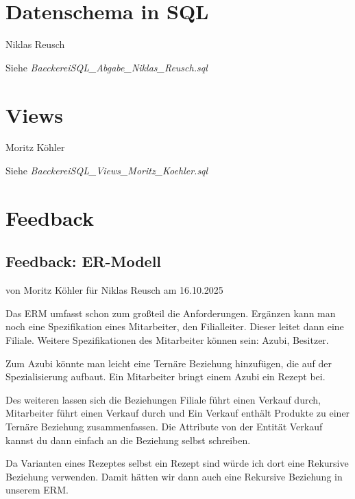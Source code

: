 \documentclass[a4paper]{article}
\begin{document}
\newpage
\section{Datenschema in SQL}

\begin{flushright}
Niklas Reusch
\end{flushright}

Siehe \textit{BaeckereiSQL\_Abgabe\_Niklas\_Reusch.sql}

\section{Views}

\begin{flushright}
Moritz Köhler
\end{flushright}

Siehe \textit{BaeckereiSQL\_Views\_Moritz\_Koehler.sql}

\newpage
\section{Feedback}

\subsection{Feedback: ER-Modell}

\begin{flushright}
von Moritz Köhler für Niklas Reusch am 16.10.2025
\end{flushright}

Das ERM umfasst schon zum großteil die Anforderungen. Ergänzen kann man noch eine Spezifikation eines Mitarbeiter, den Filialleiter. Dieser leitet dann eine Filiale. Weitere Spezifikationen des Mitarbeiter können sein: Azubi, Besitzer.

Zum Azubi könnte man leicht eine Ternäre Beziehung hinzufügen, die auf der Spezialisierung aufbaut. Ein Mitarbeiter bringt einem Azubi ein Rezept bei.

Des weiteren lassen sich die Beziehungen Filiale führt einen Verkauf durch, Mitarbeiter führt einen Verkauf durch und Ein Verkauf enthält Produkte zu einer Ternäre Beziehung zusammenfassen. Die Attribute von der Entität Verkauf kannst du dann einfach an die Beziehung selbst schreiben.

Da Varianten eines Rezeptes selbst ein Rezept sind würde ich dort eine Rekursive Beziehung verwenden. Damit hätten wir dann auch eine Rekursive Beziehung in unserem ERM.
\end{document}

